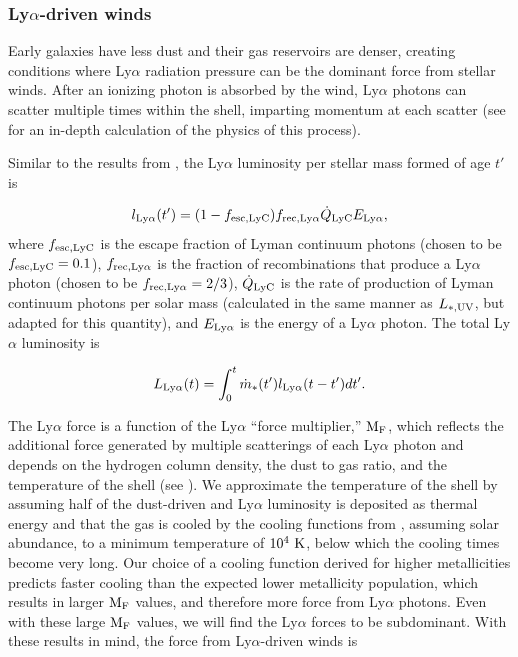 \documentclass[a4paper,11pt]{article}
\begin{document}
\subsubsection{Ly$\alpha$-driven winds}

Early galaxies have less dust and their gas reservoirs are denser, creating conditions where Ly$\alpha$ radiation pressure can be the dominant force from stellar winds. After an ionizing photon is absorbed by the wind, Ly$\alpha$ photons can scatter multiple times within the shell, imparting momentum at each scatter (see \cite{Nebrin2025} for an in-depth calculation of the physics of this process). 

Similar to the results from \cite{Nebrin2025}, the Ly$\alpha$ luminosity per stellar mass formed of age $t'$ is

\begin{equation}
    l_{\rm Ly\alpha} (t') = (1 - f_{\rm esc, LyC}) f_{\rm rec, Ly\alpha} \dot{Q}_{\rm LyC} E_{\rm Ly\alpha},
\end{equation}
%
where $f_{\rm esc, LyC}$ is the escape fraction of Lyman continuum photons (chosen to be $f_{\rm esc, LyC} = 0.1$), $f_{\rm rec, Ly\alpha}$ is the fraction of recombinations that produce a Ly$\alpha$ photon (chosen to be $f_{\rm rec, Ly\alpha} = 2/3$), $\dot{Q}_{\rm LyC}$ is the rate of production of Lyman continuum photons per solar mass 
(calculated in the same manner as $L_{*, \rm UV}$, but adapted for this quantity), 
and $E_{\rm Ly\alpha}$ is the energy of a Ly$\alpha$ photon. The total Ly$\alpha$ luminosity is

\begin{equation}
    L_{\rm Ly\alpha} (t) = \int^{t}_{0} \dot{m}_{*}(t') l_{\rm Ly\alpha}(t - t') dt'.
\end{equation}

The Ly$\alpha$ force is a function of the Ly$\alpha$ ``force multiplier,'' $\mathrm{M}_{\rm F}$, which reflects the additional force generated by multiple scatterings of each Ly$\alpha$ photon and depends on the hydrogen column density, the dust to gas ratio, and the temperature of the shell (see \cite{Nebrin2025}). 
We approximate the temperature of the shell by assuming half of the dust-driven and Ly$\alpha$ luminosity is deposited as thermal energy and that the gas is cooled by the cooling functions from \cite{Schure2009}, assuming solar abundance, to a minimum temperature of $10^{4} \rm \ K$, below which the cooling times become very long. Our choice of a cooling function derived for higher metallicities predicts faster cooling than the expected lower metallicity population, which results in larger $\rm M_{F}$ values, and therefore more force from Ly$\alpha$ photons. Even with these large $\rm M_{F}$ values, we will find the Ly$\alpha$ forces to be subdominant. With these results in mind, the force from Ly$\alpha$-driven winds is
\end{document}
